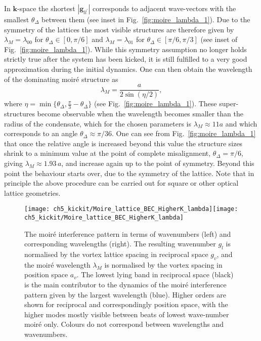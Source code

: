 In $\mathbf{k}$-space the shortest $|\mathbf{g}_{ll^\prime}|$ corresponds to adjacent wave-vectors with the smallest $\theta_\Delta$ between them (see inset in Fig.~\ref{fig:moire_lambda_1}). Due to the symmetry of the lattices the most visible structures are therefore given by $\lambda_M=\lambda_{00}$ for $\theta_\Delta\in[0,\pi/6]$ and $\lambda_M=\lambda_{01}$ for $\theta_\Delta\in[\pi/6,\pi/3]$ (see inset of Fig.~\ref{fig:moire_lambda_1}).
While this symmetry assumption no longer holds strictly true after the system has been kicked, it is still fulfilled to a very good approximation during the initial dynamics. One can then obtain the wavelength of the dominating moir\'e structure as~\cite{BIO:Blair_jneur_2007,SS:Yankowitz_natphys_2012}
    	\begin{equation}
    		\lambda_M = \frac{a}{2\sin(\eta/2)},
    		\label{eqn:moire_size}
    	\end{equation}
    where $\eta=\min\{\theta_\Delta,\frac{\pi}{3} - \theta_\Delta \} $  (see Fig.~\ref{fig:moire_lambda_1}).
These super-structures become observable when the wavelength becomes smaller than the radius of the condensate, which for the chosen parameters is $\lambda_M \approx 11a$ and which corresponds to an angle $\theta_\Delta \approx \pi/36$.
One can see from Fig.~\ref{fig:moire_lambda_1} that once the relative angle is increased beyond this value the structure sizes shrink to a minimum value at the point of complete misalignment, $\theta_\Delta=\pi/6$, giving $\lambda_M\approx 1.93\,a$, and increase again up to the point of symmetry. Beyond this point the behaviour starts over, due to the symmetry of the lattice. Note that in principle the above procedure can be carried out for square or other optical lattice geometries.

\begin{figure}[ht]\label{fig:moire_higher}
    \centering
	\texttt{[image: ch5\_kickit/Moire\_lattice\_BEC\_HigherK\_lambda]}\texttt{[image: ch5\_kickit/Moire\_lattice\_BEC\_HigherK\_lambda]}
    \caption[The moir\'e interference pattern in terms of wavenumbers.]{The moir\'e interference pattern in terms of wavenumbers (left) and corresponding wavelengths (right). The resulting wavenumber $g_l$ is normalised by the vortex lattice spacing in reciprocal space $g_v$, and the moir\'e wavelength $\lambda_M$ is normalised by the vortex spacing in position space $a_v$. The lowest lying band in reciprocal space (black) is the main contributor to the dynamics of the moir\'e interference pattern given by the largest wavelength (blue). Higher orders are shown for reciprocal and correspondingly position space, with the higher modes mostly visible between beats of lowest wave-number moir\'e only. Colours do not correspond between wavelengths and wavenumbers.}
\end{figure}

